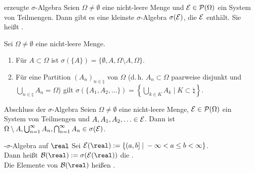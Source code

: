 \begin{Def}{erzeugte $\sigma$-Algebra}
    Seien $\Omega \not= \emptyset$ eine nicht-leere Menge und $\mathcal{E} \in \mathcal{P}(\Omega)$ ein
    System von Teilmengen.
    Dann gibt es eine kleinste $\sigma$-Algebra $\sigma(\mathcal{E})$, die $\mathcal{E}$ enthält.
    Sie heißt .
\end{Def}

\begin{Bsp}
    Sei $\Omega \not= \emptyset$ eine nicht-leere Menge.
    \begin{enumerate}
        \item
        Für $A \subset \Omega$ ist $\sigma(\{A\}) = \{\emptyset, A, \Omega \setminus A, \Omega\}$.
        
        \item
        Für eine Partition $(A_n)_{n \in \natural}$ von $\Omega$
        (d.\,h. $A_n \subset \Omega$ paarweise disjunkt und
        $\bigcup_{n \in \natural} A_n = \Omega$) gilt
        $\sigma(\{A_1, A_2, \dotsc\}) = \left\{\bigcup_{k \in K} A_k \;|\;
        K \subset \natural\right\}$.
    \end{enumerate}
\end{Bsp}

\begin{Satz}{Abschluss der $\sigma$-Algebra}
    Seien $\Omega \not= \emptyset$ eine nicht-leere Menge, $\mathcal{E} \in \mathcal{P}(\Omega)$ ein
    System von Teilmengen und $A, A_1, A_2, \dotsc \in \mathcal{E}$.
    Dann ist $\Omega \setminus A, \bigcup_{n=1}^\infty A_n,
    \bigcap_{n=1}^\infty A_n \in \sigma(\mathcal{E})$.
\end{Satz}

\linie

\begin{Def}{-$\sigma$-Algebra auf $\real$}
    Sei $\E(\real) := \{(a, b] \;|\; -\infty < a \le b < \infty\}$.\\
    Dann heißt $\B(\real) := \sigma(\E(\real))$ die
    .\\
    Die Elemente von $\B(\real)$ heißen .
\end{Def}

